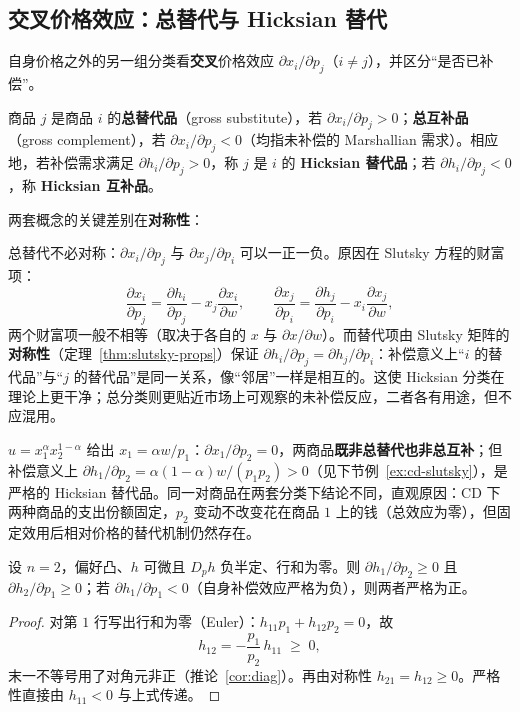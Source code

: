 \subsection{交叉价格效应：总替代与 Hicksian 替代}

自身价格之外的另一组分类看\textbf{交叉}价格效应 $\partial x_i/\partial p_j$（$i\ne j$），并区分“是否已补偿”。

\begin{definition}
商品 $j$ 是商品 $i$ 的\textbf{总替代品}（gross substitute），若 $\partial x_i/\partial p_j>0$；\textbf{总互补品}（gross complement），若 $\partial x_i/\partial p_j<0$（均指未补偿的 Marshallian 需求）。相应地，若补偿需求满足 $\partial h_i/\partial p_j>0$，称 $j$ 是 $i$ 的 \textbf{Hicksian 替代品}；若 $\partial h_i/\partial p_j<0$，称 \textbf{Hicksian 互补品}。
\end{definition}

两套概念的关键差别在\textbf{对称性}：

\begin{remark}
总替代不必对称：$\partial x_i/\partial p_j$ 与 $\partial x_j/\partial p_i$ 可以一正一负。原因在 Slutsky 方程的财富项：
\[
 \frac{\partial x_i}{\partial p_j}
 =\frac{\partial h_i}{\partial p_j}-x_j\frac{\partial x_i}{\partial w},\qquad
 \frac{\partial x_j}{\partial p_i}
 =\frac{\partial h_j}{\partial p_i}-x_i\frac{\partial x_j}{\partial w},
\]
两个财富项一般不相等（取决于各自的 $x$ 与 $\partial x/\partial w$）。而替代项由 Slutsky 矩阵的\textbf{对称性}（定理~\ref{thm:slutsky-props}）保证 $\partial h_i/\partial p_j=\partial h_j/\partial p_i$：补偿意义上“$i$ 的替代品”与“$j$ 的替代品”是同一关系，像“邻居”一样是相互的。这使 Hicksian 分类在理论上更干净；总分类则更贴近市场上可观察的未补偿反应，二者各有用途，但不应混用。
\end{remark}

\begin{example}
$u=x_1^{\alpha}x_2^{1-\alpha}$ 给出 $x_1=\alpha w/p_1$：$\partial x_1/\partial p_2=0$，两商品\textbf{既非总替代也非总互补}；但补偿意义上 $\partial h_1/\partial p_2=\alpha(1-\alpha)w/(p_1p_2)>0$（见下节例~\ref{ex:cd-slutsky}），是严格的 Hicksian 替代品。同一对商品在两套分类下结论不同，直观原因：CD 下两种商品的支出份额固定，$p_2$ 变动不改变花在商品 $1$ 上的钱（总效应为零），但固定效用后相对价格的替代机制仍然存在。
\end{example}

\begin{proposition}\label{prop:two-goods}
设 $n=2$，偏好凸、$h$ 可微且 $D_p h$ 负半定、行和为零。则 $\partial h_1/\partial p_2\ge0$ 且 $\partial h_2/\partial p_1\ge0$；若 $\partial h_1/\partial p_1<0$（自身补偿效应严格为负），则两者严格为正。
\end{proposition}
\begin{proof}
对第 $1$ 行写出行和为零（Euler）：$h_{11}p_1+h_{12}p_2=0$，故
\[
 h_{12}=-\frac{p_1}{p_2}\,h_{11}\;\ge\;0,
\]
末一不等号用了对角元非正（推论~\ref{cor:diag}）。再由对称性 $h_{21}=h_{12}\ge0$。严格性直接由 $h_{11}<0$ 与上式传递。
\end{proof}

